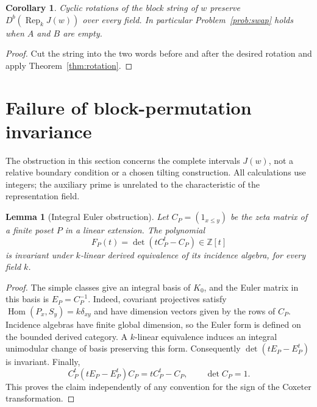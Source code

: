 \documentclass[11pt]{article}
\newtheorem{lemma}[theorem]{Lemma}
\newtheorem{corollary}[theorem]{Corollary}
\theoremstyle{definition}
\newcommand{\Rep}{\operatorname{Rep}}
\newcommand{\Db}{D^b}
\begin{document}
\begin{corollary}\label{cor:cyclic}
Cyclic rotations of the block string of $w$ preserve
$\Db(\Rep_k J(w))$ over every field. In particular
Problem~\ref{prob:swap} holds when $A$ and $B$ are empty.
\end{corollary}
\begin{proof}
Cut the string into the two words before and after the desired
rotation and apply Theorem~\ref{thm:rotation}.
\end{proof}



\section{Failure of block-permutation invariance}
\label{sec:failure}
\label{sec:counterexample}
The obstruction in this section concerns the complete intervals $J(w)$,
not a relative boundary condition or a chosen tilting construction.
All calculations use integers; the auxiliary prime is unrelated to the
characteristic of the representation field.

\begin{lemma}[Integral Euler obstruction]\label{lem:euler-polynomial}
Let $C_P=(1_{x\leq y})$ be the zeta matrix of a finite poset $P$ in a
linear extension. The polynomial
\[
 F_P(t)=\det(tC_P^t-C_P)\in\mathbb Z[t]
\]
is invariant under $k$-linear derived equivalence of its incidence
algebra, for every field $k$.
\end{lemma}
\begin{proof}
The simple classes give an integral basis of $K_0$, and the Euler
matrix in this basis is $E_P=C_P^{-1}$. Indeed, covariant projectives
satisfy $\operatorname{Hom}(P_x,S_y)=k\delta_{xy}$ and have dimension
vectors given by the rows of $C_P$. Incidence algebras have finite
global dimension, so the Euler form is defined on the bounded derived
category. A $k$-linear equivalence induces an integral unimodular
change of basis preserving this form. Consequently
$\det(tE_P-E_P^t)$ is invariant. Finally,
\[
 C_P^t(tE_P-E_P^t)C_P=tC_P^t-C_P,\qquad \det C_P=1.
\]
This proves the claim independently of any convention for the sign
of the Coxeter transformation.
\end{proof}
\end{document}

